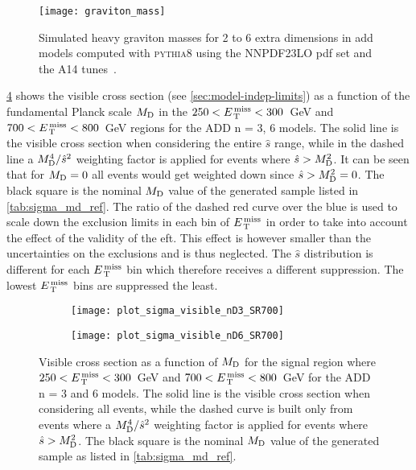\begin{figure}[!htb]
  \centering
  \texttt{[image: graviton\_mass]}
  \caption{Simulated heavy graviton masses for 2 to 6 extra dimensions in
    \gls{add} models computed with \textsc{pythia8} using the NNPDF23LO
    \gls{pdf} set and the A14 tunes~\cite{OllePhDThesis}.}
  \label{fig:graviton_mass}
\end{figure}

\cref{fig:vis_sigma_trunc} shows the visible cross section (see
\cref{sec:model-indep-limits}) as a function of the fundamental Planck scale
$M_\mathrm{D}$ in the $250 < E_\mathrm{\, T}^\mathrm{\, miss} < 300$~GeV and $700 < E_\mathrm{\, T}^\mathrm{\, miss} < 800$~GeV regions for the
ADD n = 3, 6 models. The solid line is the visible cross section when
considering the entire $\hat{s}$ range, while in the dashed line a
$M_\mathrm{D}^4/\hat{s}^2$ weighting factor is applied for events where
$\hat{s} > M_\mathrm{D}^2$. It can be seen that for $M_\mathrm{D} = 0$ all events would get
weighted down since $\hat{s} > M_\mathrm{D}^2 = 0$. The black square is the nominal $M_\mathrm{D}$
value of the generated sample listed in \cref{tab:sigma_md_ref}. The ratio of
the dashed red curve over the blue is used to scale down the exclusion limits in
each bin of $E_\mathrm{\, T}^\mathrm{\, miss}$ in order to take into account the effect of the validity of
the \gls{eft}. This effect is however smaller than the uncertainties on the
exclusions and is thus neglected. The $\hat{s}$ distribution is different for
each $E_\mathrm{\, T}^\mathrm{\, miss}$ bin which therefore receives a different suppression. The lowest
$E_\mathrm{\, T}^\mathrm{\, miss}$ bins are suppressed the least.
\begin{figure}[!htb]
  \centering
  \begin{subfigure}{.48\linewidth}
    \texttt{[image: plot\_sigma\_visible\_nD3\_SR700]}
    \caption{}
    \label{fig:sigma_vis_n3}
  \end{subfigure}
  \begin{subfigure}{.48\linewidth}
    \texttt{[image: plot\_sigma\_visible\_nD6\_SR700]}
    \caption{}
    \label{fig:sigma_vis_n6}
  \end{subfigure}
  \caption{Visible cross section as a function of $M_\mathrm{D}$ for the signal region
    where $250 < E_\mathrm{\, T}^\mathrm{\, miss} < 300$~GeV and $700 < E_\mathrm{\, T}^\mathrm{\, miss} < 800$~GeV for the ADD n = 3
    and 6 models. The solid line is the visible cross section when considering
    all events, while the dashed curve is built only from events where a
    $M_\mathrm{D}^4/\hat{s}^2$ weighting factor is applied for events where
    $\hat{s} > M_\mathrm{D}^2$. The black square is the nominal $M_\mathrm{D}$ value of the
    generated sample as listed in \cref{tab:sigma_md_ref}.}
  \label{fig:vis_sigma_trunc}
\end{figure}
